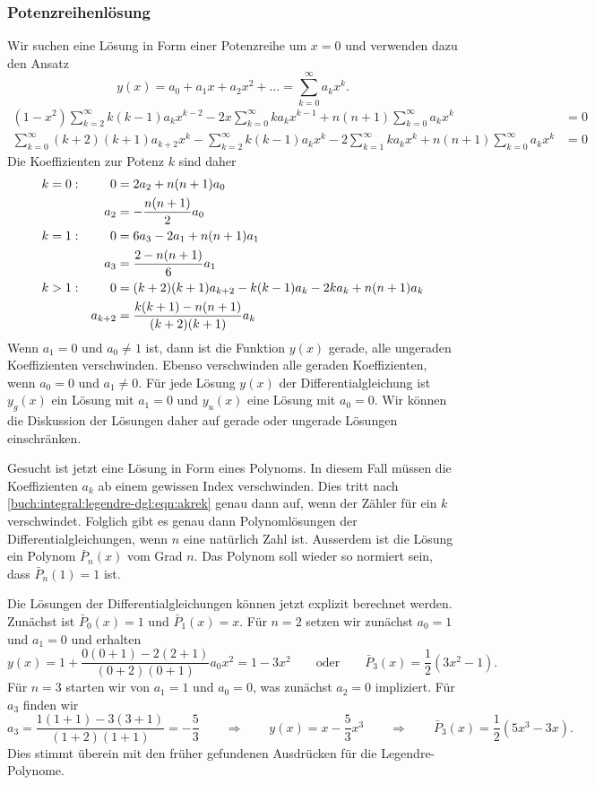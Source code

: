 \subsubsection{Potenzreihenlösung}
Wir suchen eine Lösung in Form einer Potenzreihe um $x=0$ und 
verwenden dazu den Ansatz
\[
y(x) = a_0+a_1x+a_2x^2+ \dots = \sum_{k=0}^\infty a_kx^k.
\]
\begin{align*}
(1-x^2) \sum_{k=2}^\infty k(k-1)a_kx^{k-2}
-2x\sum_{k=0}^\infty ka_kx^{k-1}
+
n(n+1)\sum_{k=0}^\infty  a_kx^k
&=
0
\\
\sum_{k=0}^\infty (k+2)(k+1)a_{k+2}x^k
-
\sum_{k=2}^\infty k(k-1)a_kx^k
-
2\sum_{k=1}^\infty ka_kx^k
+
n(n+1)\sum_{k=0}^\infty  a_kx^k
&=
0
\end{align*}
Die Koeffizienten zur Potenz $k$ sind daher
\begin{align}
k&=0:
&
0&=
2a_2+n(n+1)a_0
\notag
\\
&&
a_2&=-\frac{n(n+1)}{2}a_0
\notag
\\
k&=1:
&
0&=
6a_3-2a_1+n(n+1)a_1
\notag
\\
&&
a_3&= \frac{2-n(n+1)}{6}a_1
\notag
\\
k&>1:
&
0&=
(k+2)(k+1)a_{k+2} -k(k-1)a_k -2ka_k +n(n+1) a_k
\notag
\\
&&
a_{k+2}
&=
\frac{ k(k+1)-n(n+1) }{(k+2)(k+1)}
a_k
\label{buch:integral:legendre-dgl:eqn:akrek}
\end{align}
Wenn $a_1=0$ und $a_0\ne 1$ ist, dann ist die Funktion $y(x)$ gerade,
alle ungeraden Koeffizienten verschwinden.
Ebenso verschwinden alle geraden Koeffizienten, wenn $a_0=0$ und $a_1\ne 0$.
Für jede Lösung $y(x)$ der Differentialgleichung ist
$y_g(x)$ ein Lösung mit $a_1=0$ und $y_u(x)$ eine Lösung mit $a_0=0$.
Wir können die Diskussion der Lösungen daher auf gerade oder ungerade
Lösungen einschränken.

Gesucht ist jetzt eine Lösung in Form eines Polynoms.
In diesem Fall müssen die Koeffizienten $a_k$ ab einem
gewissen Index verschwinden.
Dies tritt nach \eqref{buch:integral:legendre-dgl:eqn:akrek} genau
dann auf, wenn der Zähler für ein $k$ verschwindet.
Folglich gibt es genau dann Polynomlösungen der Differentialgleichungen,
wenn $n$ eine natürlich Zahl ist.
Ausserdem ist die Lösung ein Polynom $\bar{P}_n(x)$ vom Grad $n$.
Das Polynom soll wieder so normiert sein, dass $\bar{P}_n(1)=1$ ist.

Die Lösungen der Differentialgleichungen können jetzt explizit
berechnet werden.
Zunächst ist $\bar{P}_0(x)=1$ und $\bar{P}_1(x)=x$.
Für $n=2$ setzen wir zunächst $a_0=1$ und $a_1=0$ und erhalten
\[
y(x)
=
1 + \frac{0(0+1) - 2(2+1)}{(0+2)(0+1)}a_0 x^2
=
1
-3x^2
\qquad\text{oder}\qquad
\bar{P}_3(x) = \frac12(3x^2-1).
\]
Für $n=3$ starten wir von $a_1=1$ und $a_0=0$, was zunächst $a_2=0$
impliziert.
Für $a_3$ finden wir
\[
a_3=\frac{1(1+1)-3(3+1)}{(1+2)(1+1)} = -\frac53
\qquad\Rightarrow\qquad
y(x) = x-\frac53x^3
\qquad\Rightarrow\qquad
\bar{P}_3(x) = \frac12(5x^3-3x).
\]
Dies stimmt überein mit den früher gefundenen Ausdrücken für
die Legendre-Polynome.

